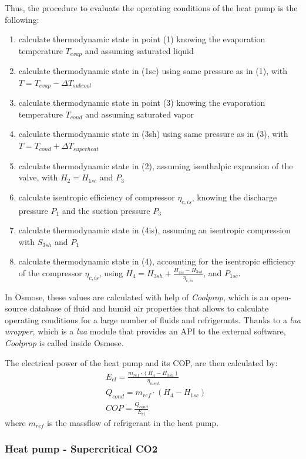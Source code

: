 \documentclass{article}
\begin{document}
Thus, the procedure to evaluate the operating conditions of the heat pump is the following:
\begin{enumerate}
	\item calculate thermodynamic state in point (1) knowing the evaporation temperature $T_{evap}$ and assuming saturated liquid
	\item calculate thermodynamic state in (1sc) using same pressure as in (1), with $T = T_{evap} - \Delta T_{subcool}$
	\item calculate thermodynamic state in point (3) knowing the evaporation temperature $T_{cond}$ and assuming saturated vapor
	\item calculate thermodynamic state in (3sh) using same pressure as in (3), with $T = T_{cond} + \Delta T_{superheat}$
	\item calculate thermodynamic state in (2), assuming isenthalpic expansion of the valve, with $H_{2} = H_{1sc}$ and $P_{3}$
	\item calculate isentropic efficiency of compressor $\eta_{c,is}$, knowing the discharge pressure $P_{1}$ and the suction pressure $P_{3}$
	\item calculate thermodynamic state in (4is), assuming an isentropic compression with $S_{3sh}$ and $P_{1}$
	\item calculate thermodynamic state in (4), accounting for the isentropic efficiency of the compressor $\eta_{c,is}$, using $H_{4} = H_{3sh} + \frac{H_{4is} - H_{3sh}}{\eta_{c,is}}$, and $P_{1sc}$.
\end{enumerate}

In Osmose, these values are calculated with help of \textit{Coolprop}, which is an open-source database of fluid and humid air properties that allows to calculate operating conditions for a large number of fluids and refrigerants. Thanks to a \textit{lua wrapper}, which is a \textit{lua} module that provides an API to the external software, \textit{Coolprop} is called inside Osmose.

The electrical power of the heat pump and its COP, are then calculated by:
\begin{align}
	& E_{el} = \frac{m_{ref} \cdot (H_{4}-H_{3sh})}{\eta_{mech}}\\
	& Q_{cond} = m_{ref} \cdot (H_{4}-H_{1sc})\\
	& COP = \frac{Q_{cond}}{E_{el}}
\end{align}
where $m_{ref}$ is the massflow of refrigerant in the heat pump.


\subsubsection{Heat pump - Supercritical CO2}\label{sss:hp_CO2}
\end{document}

